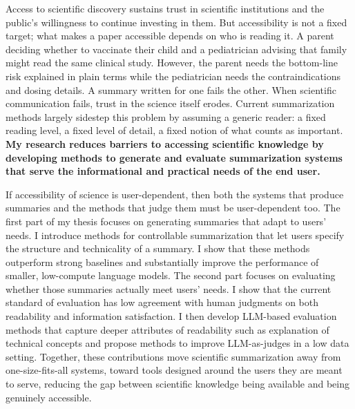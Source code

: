 

Access to scientific discovery sustains trust in scientific institutions and the public's willingness to continue investing in them. But accessibility is not a fixed target; what makes a paper accessible depends on who is reading it. A parent deciding whether to vaccinate their child and a pediatrician advising that family might read the same clinical study. However, the parent needs the bottom-line risk explained in plain terms while the pediatrician needs the contraindications and dosing details. A summary written for one fails the other.
When scientific communication fails, trust in the science itself erodes. Current summarization methods largely sidestep this problem by assuming a generic reader: a fixed reading level, a fixed level of detail, a fixed notion of what counts as important. \textbf{My research reduces barriers to accessing scientific knowledge by developing methods to generate and evaluate summarization systems that serve the informational and practical needs of the end user. }


If accessibility of science is user-dependent, then both the systems that produce summaries and the methods that judge them must be user-dependent too. The first part of my thesis focuses on generating summaries that adapt to users’ needs. I introduce methods for controllable summarization that let users specify the structure and technicality of a summary. I show that these methods outperform strong baselines and substantially improve the performance of smaller, low-compute language models. The second part focuses on evaluating whether those summaries actually meet users' needs. I show that the current standard of evaluation has low agreement with human judgments on both readability and information satisfaction. I then develop LLM-based evaluation methods that capture deeper attributes of readability such as explanation of technical concepts and propose methods to improve LLM-as-judges in a low data setting. Together, these contributions move scientific summarization away from one-size-fits-all systems, toward tools designed around the users they are meant to serve, reducing the gap between scientific knowledge being available and being genuinely accessible.






